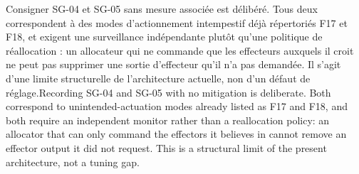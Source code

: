 \documentclass[11pt,a4paper,oneside]{report}
\newcommand{\bi}[2]{\iffrench #2\else #1\fi}
\begin{document}
\bi{Recording SG-04 and SG-05 with no mitigation is deliberate. Both correspond to unintended-actuation modes already listed as F17 and F18, and both require an independent monitor rather than a reallocation policy: an allocator that can only command the effectors it believes in cannot remove an effector output it did not request. This is a structural limit of the present architecture, not a tuning gap.}{Consigner SG-04 et SG-05 sans mesure associée est délibéré. Tous deux correspondent à des modes d'actionnement intempestif déjà répertoriés F17 et F18, et exigent une surveillance indépendante plutôt qu'une politique de réallocation : un allocateur qui ne commande que les effecteurs auxquels il croit ne peut pas supprimer une sortie d'effecteur qu'il n'a pas demandée. Il s'agit d'une limite structurelle de l'architecture actuelle, non d'un défaut de réglage.}
\end{document}
